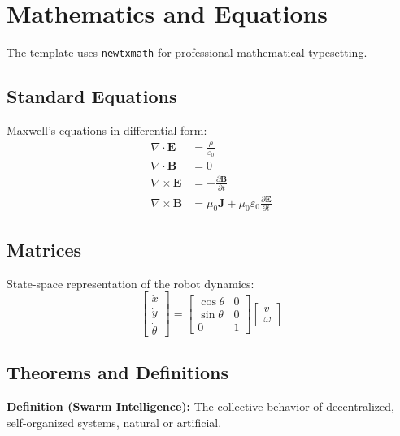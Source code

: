 \section{Mathematics and Equations}
The template uses \texttt{newtxmath} for professional mathematical typesetting.

\subsection{Standard Equations}
Maxwell's equations in differential form:
\begin{align}
    \nabla \cdot \mathbf{E} &= \frac{\rho}{\varepsilon_0} \label{eq:maxwell1} \\
    \nabla \cdot \mathbf{B} &= 0 \label{eq:maxwell2} \\
    \nabla \times \mathbf{E} &= -\frac{\partial \mathbf{B}}{\partial t} \label{eq:maxwell3} \\
    \nabla \times \mathbf{B} &= \mu_0\mathbf{J} + \mu_0\varepsilon_0\frac{\partial \mathbf{E}}{\partial t} \label{eq:maxwell4}
\end{align}

\subsection{Matrices}
State-space representation of the robot dynamics:
\begin{equation}
    \begin{bmatrix}
        \dot{x} \\
        \dot{y} \\
        \dot{\theta}
    \end{bmatrix}
    =
    \begin{bmatrix}
        \cos\theta & 0 \\
        \sin\theta & 0 \\
        0 & 1
    \end{bmatrix}
    \begin{bmatrix}
        v \\
        \omega
    \end{bmatrix}
\end{equation}

\subsection{Theorems and Definitions}
\begin{notebox}
    \textbf{Definition (Swarm Intelligence):} The collective behavior of decentralized, self-organized systems, natural or artificial.
\end{notebox}

